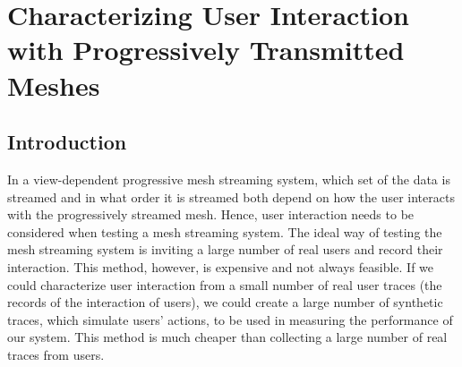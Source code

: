 \chapter{Characterizing User Interaction with Progressively Transmitted Meshes}
\label{c:user}
\section{Introduction}
In a view-dependent progressive mesh streaming system, which set of the data is streamed
and in what order it is streamed both depend on how the user interacts with the 
progressively streamed mesh. 
Hence, user interaction needs to be considered when testing a mesh streaming system.
The ideal way of testing the mesh streaming system is inviting a large number of real users
and record their interaction. 
This method, however, is expensive and not always feasible. 
If we could characterize user interaction from a small number of real user traces
(the records of the interaction of users), 
we could create a large number of synthetic traces,
which simulate users' actions, to be used in measuring the performance
of our system. 
This method is much cheaper than collecting a large number of real traces from users.



